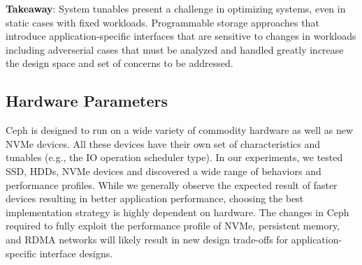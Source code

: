 
\textbf{Takeaway}: System tunables present a challenge in optimizing systems,
even in static cases with fixed workloads. Programmable storage approaches
that introduce application-specific interfaces that are sensitive to changes
in workloads including adverserial cases that must be analyzed and handled
greatly increase the design space and set of concerns to be addressed.

\subsection{Hardware Parameters}

Ceph is designed to run on a wide variety of commodity hardware as well as new
NVMe devices. All these devices have their own set of characteristics and
tunables (e.g., the IO operation scheduler type). In our experiments, we tested
SSD, HDDs, NVMe devices and discovered a wide range of behaviors and
performance profiles. While we generally observe the expected result of faster
devices resulting in better application performance, choosing the best
implementation strategy is highly dependent on hardware. The changes in Ceph
required to fully exploit the performance profile of NVMe, persistent
memory, and RDMA networks will likely result in new design trade-offs for
application-specific interface designs.
